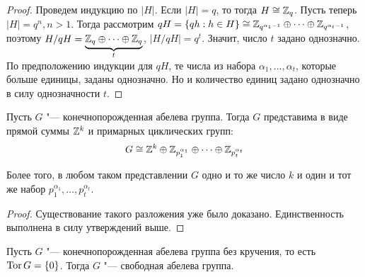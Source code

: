 \begin{proof}
	Проведем индукцию по $|H|$. Если $|H| = q$, то тогда $H \cong \mathbb{Z}_q$. Пусть теперь $|H| = q^n, n > 1$. Тогда рассмотрим $qH \hm= \{qh : h \in H\} \cong \Z_{q^{\alpha_1 - 1}} \oplus \dotsb \oplus \Z_{q^{\alpha_t - 1}}$, поэтому $H / qH = \underbrace{\mathbb{Z}_q \oplus \dotsb \oplus \mathbb{Z}_q}_{t}$, $|H / qH| = q^t$. Значит, число $t$ задано однозначно. По предположению индукции для $qH$, те числа из набора $\alpha_1, \dotsc, \alpha_t$, которые больше единицы, заданы однозначно. Но и количество единиц задано однозначно в силу однозначности $t$.
\end{proof}

\begin{theorem}
	Пусть $G$ "--- конечнопорожденная абелева группа. Тогда $G$ представима в виде прямой суммы $\mathbb{Z}^k$ и примарных циклических групп: 
	\[G \cong \mathbb{Z}^k \oplus \mathbb{Z}_{p_1^{\alpha_1}} \oplus \dots \oplus \mathbb{Z}_{p_t^{\alpha_t}}\]
	
	Более того, в любом таком представлении $G$ одно и то же число $k$ и один и тот же набор $p_1^{\alpha_1}, \dotsc, p_t^{\alpha_t}$.
\end{theorem}

\begin{proof}
	Существование такого разложения уже было доказано. Единственность выполнена в силу утверждений выше.
\end{proof}

\begin{corollary}
	Пусть $G$ "--- конечнопорожденная абелева группа без кручения, то есть $\operatorname{Tor}{G} = \{0\}$. Тогда $G$ "--- свободная абелева группа.
\end{corollary}